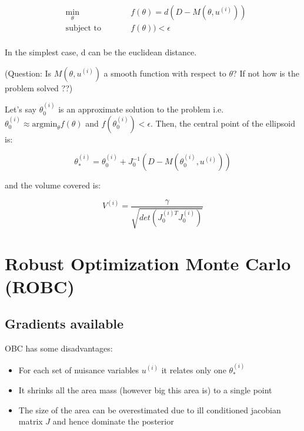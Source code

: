 \documentclass{article}
\begin{document}
\begin{subequations}
\begin{alignat}{2}
&\!\min_{\theta}        &\qquad& f(\theta) = d(D - M(\theta, u^{(i)}))\label{eq:optProb}\\
&\text{subject to} &      & f(\theta)) < \epsilon \\
\end{alignat}
\end{subequations}

In the simplest case, d can be the euclidean distance.

(Question: Is $M(\theta, u^{(i)})$ a smooth function with respect to $\theta$? If not how is the problem solved ??)

Let's say $\theta_0^{(i)}$ is an approximate solution to the problem i.e. $\theta_0^{(i)} \approx \text{argmin}_\theta f(\theta)$ and $f(\theta_0^{(i)}) < \epsilon$. Then, the central point of the ellipsoid is:

\begin{equation}
  \theta_*^{(i)} = \theta_0^{(i)} + J_0^{-1}(D - M(\theta^{(i)}_0, u^{(i)}))
\end{equation}

and the volume covered is:

\begin{equation}
  V^{(i)} = \frac{\gamma}{\sqrt{det( J_0^{(i)T}J_0^{(i)})}}
\end{equation}

\section{Robust Optimization Monte Carlo (ROBC)}

\subsection{Gradients available}

OBC has some disadvantages:

\begin{itemize}
\item For each set of nuisance variables $u^{(i)}$ it relates only one $\theta_*^{(i)}$ %
\item It shrinks all the area mass (however big this area is) to a single point
  \item The size of the area can be overestimated due to ill conditioned jacobian matrix $J$ and hence dominate the posterior
\end{itemize}
\end{document}
